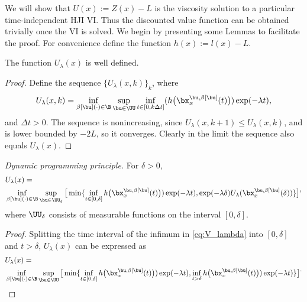 \begin{for_journal}

We will show that $U(x):= Z(x) - L$ is the viscosity solution to a particular time-independent HJI VI. Thus the discounted value function can be obtained trivially once the VI is solved. We begin by presenting some Lemmas to facilitate the proof. For convenience define the function $h(x):=l(x)-L$.

\begin{lemma}
The function $U_\lambda(x)$ is well defined. 
\end{lemma} 

\begin{proof}
Define the sequence $\{U_\lambda(x,k)\}_k$, where
\begin{equation}
U_\lambda(x,k) = \inf_{\beta[\bu](\cdot) \in \B} \sup_{\bu \in \UU} \inf_{t \in [0,k\Delta t]}(h\big(\bx_{x}^{\bu,\beta[\bu]}(t)\big))\exp(-\lambda  t),
\end{equation}
\noindent and $\Delta t>0$. The sequence is nonincreasing, since $U_\lambda(x,k+1) \leq U_\lambda(x,k)$, and is lower bounded by $-2L$, so it converges. Clearly in the limit the sequence also equals $U_{\lambda}(x)$.
\end{proof}



\begin{lemma} \label{dpp}
\emph{Dynamic programming principle.} For $\delta>0$,
\begin{equation} 
\begin{split}
&U_{\lambda}(x) =\\ 
&\inf_{\beta[\bu](\cdot) \in \B} \sup_{\bu \in \UU_\delta} 
\big [\min\{\inf_{t \in [0, \delta]} h\big(\bx_{x}^{\bu,\beta[\bu]}(t)\big))\exp(-\lambda  t), \exp(-\lambda \delta)U_{\lambda}(\bx_{x}^{\bu,\beta[\bu]}(\delta))\}
\big ]
\end{split},
\end{equation}%
\noindent where $\UU_{\delta}$ consists of measurable functions on the interval
$[0,\delta]$.
\end{lemma}

\begin{proof}
Splitting the time interval of the infimum in \eqref{eq:V_lambda} into $[0,\delta]$ and $t>\delta$, $U_{\lambda}(x)$ can be expressed as
\begin{equation}
\begin{split}{}{}{}
&U_{\lambda}(x) =\\ 
&\inf_{\beta[\bu](\cdot) \in \B} \sup_{\bu \in \UU} 
\big [\min\{\inf_{t \in [0, \delta]} h\big(\bx_{x}^{\bu,\beta[\bu]}(t)\big))\exp(-\lambda  t), \inf_{t > \delta} h\big(\bx_{x}^{\bu,\beta[\bu]}(t)\big))\exp(-\lambda  t)\}
\big ]
\end{split}.
\end{equation}


\end{proof}
\end{for_journal}
